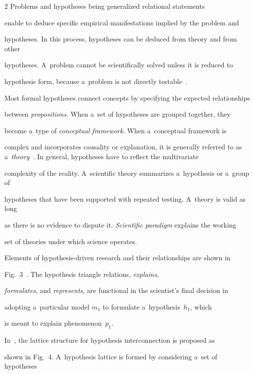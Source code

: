 \begin{multicols}{2}
Problems and hypotheses being generalized relational statements


enable to deduce specific empirical manifestations implied by the problem and


hypotheses. In this process, hypotheses can be deduced from theory and from other


hypotheses. A~problem cannot be scientifically solved unless it is reduced to


hypothesis form, because a~problem is not directly testable~\cite{9-kl}.





  Most formal hypotheses connect concepts by specifying the expected relationships


between \textit{propositions}. When a~set of hypotheses are grouped together, they


become a~type of \textit{conceptual framework}. When a~conceptual framework is


complex and incorporates causality or explanation, it is generally referred to as a~\textit{theory}~\cite{10-kl}.  In general, hypotheses have to reflect the multivariate


complexity of the reality. A~scientific theory summarizes a~hypothesis or a~group of


hypotheses that have been supported with repeated testing. A~theory is valid as long


as there is no evidence to dispute it. \textit{Scientific paradigm} explains the working


set of theories under which science operates.





  Elements of hypothesis-driven research and their relationships are shown in


Fig.~3~\cite{12-kl, 11-kl}. The hypothesis triangle relations, \textit{explains},


\textit{formulates}, and \textit{represents}, are functional in the scientist's final decision in


adopting a~particular model $m_1$ to formulate a~hypothesis~$h_1$, which


is meant to explain phenomenon~$p_1$.





  In~\cite{11-kl}, the lattice structure for hypothesis interconnection is proposed as


shown in Fig.~4. A~hypothesis lattice is formed by considering a~set of hypotheses



\end{multicols}

